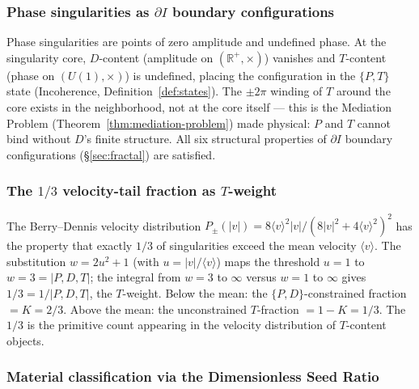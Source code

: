\documentclass[11pt,a4paper]{article}
\theoremstyle{definition}
\theoremstyle{remark}
\newcommand{\R}{\mathbb{R}}
\begin{document}
\subsubsection*{Phase singularities as $\partial I$ boundary configurations}

Phase singularities are points of zero amplitude and undefined phase. At the singularity core, $D$-content (amplitude on $(\R^{+},\times)$) vanishes and $T$-content (phase on $(U(1),\times)$) is undefined, placing the configuration in the $\{P,T\}$ state (Incoherence, Definition~\ref{def:states}). The $\pm 2\pi$ winding of $T$ around the core exists in the neighborhood, not at the core itself --- this is the Mediation Problem (Theorem~\ref{thm:mediation-problem}) made physical: $P$ and $T$ cannot bind without $D$'s finite structure. All six structural properties of $\partial I$ boundary configurations (\S\ref{sec:fractal}) are satisfied.

\subsubsection*{The $1/3$ velocity-tail fraction as $T$-weight}

The Berry--Dennis velocity distribution $P_{\pm}(|v|) = 8\langle v\rangle^{2}|v|/(8|v|^{2}+4\langle v\rangle^{2})^{2}$ has the property that exactly $1/3$ of singularities exceed the mean velocity $\langle v\rangle$. The substitution $w = 2u^{2}+1$ (with $u = |v|/\langle v\rangle$) maps the threshold $u=1$ to $w=3=|{P,D,T}|$; the integral from $w=3$ to $\infty$ versus $w=1$ to $\infty$ gives $1/3 = 1/|{P,D,T}|$, the $T$-weight. Below the mean: the $\{P,D\}$-constrained fraction $= K = 2/3$. Above the mean: the unconstrained $T$-fraction $= 1-K = 1/3$. The $1/3$ is the primitive count appearing in the velocity distribution of $T$-content objects.

\subsubsection*{Material classification via the Dimensionless Seed Ratio}
\end{document}
